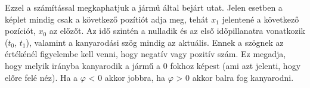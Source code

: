Ezzel a számítással megkaphatjuk a jármű által bejárt utat. Jelen esetben a képlet mindig csak a következő pozítiót adja meg, tehát $x_1$ jelentené a következő pozíciót, $x_0$ az előzőt. Az idő szintén a nulladik és az első időpillanatra vonatkozik ($t_0$, $t_1$), valamint a kanyarodási szög mindig az aktuális. Ennek a szögnek az értékénél figyelembe kell venni, hogy negatív vagy pozitív szám. Ez megadja, hogy melyik irányba kanyarodik a jármű a 0 fokhoz képest (ami azt jelenti, hogy előre felé néz). Ha a $\varphi$ < 0 akkor jobbra, ha $\varphi$ > 0  akkor balra fog kanyarodni. 
